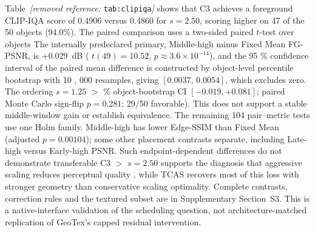 \documentclass[times,twocolumn,final]{elsarticle}
\providecommand{\DIFadd}[1]{{\protect\color{blue} \sf #1}} %
\providecommand{\DIFdel}[1]{{\protect\color{red} \scriptsize #1}} %
\providecommand{\DIFaddbegin}{} %
\providecommand{\DIFaddend}{} %
\providecommand{\DIFdelbegin}{} %
\providecommand{\DIFdelend}{} %
\begin{document}
\DIFdelbegin \DIFdel{Table~\textit{[removed reference: }\texttt{tab:clipiqa}\textit{]} shows that C3 achieves a foreground CLIP-IQA score of 0.4906 versus 0.4860 for $s = 2.50$, scoring higher on 47 of the 50 objects (94.0\%). The paired comparison uses a two-sided paired $t$-test over objects }\DIFdelend \DIFaddbegin \DIFadd{The internally predeclared primary, Middle-high minus Fixed Mean FG-PSNR, is $+0.029$~dB }\DIFaddend (\DIFdelbegin \DIFdel{$t(49)=10.52$, $p\approx3.6\times10^{-14}$), and the }\DIFdelend 95\DIFdelbegin \DIFdel{\% confidence interval of the paired mean difference is constructed by object-level percentile bootstrap with 10}%
\DIFdel{,}%
\DIFdel{000 resamples, giving $[0.0037,\,0.0054]$, which excludes zero. The ordering $s = 1.25$ $>$ }\DIFdelend \DIFaddbegin \DIFadd{\% object-bootstrap CI $[-0.019,+0.081]$; paired Monte Carlo sign-flip $p=0.281$; 29/50 favorable). This does not support a stable middle-window gain or establish equivalence. The remaining 104 pair--metric tests use one Holm family. Middle-high has lower Edge-SSIM than Fixed Mean (adjusted $p=0.00104$); some other placement contrasts separate, including Late-high versus Early-high PSNR. Such endpoint-dependent differences do not demonstrate transferable }\DIFaddend C3 \DIFdelbegin \DIFdel{$>$ $s = 2.50$ supports the diagnosis that aggressive scaling reduces perceptual quality , while TCAS recovers most of this loss with stronger geometry than conservative scaling}\DIFdelend \DIFaddbegin \DIFadd{optimality. Complete contrasts, correction rules and the textured subset are in Supplementary Section~S3. This is a native-interface validation of the scheduling question, not architecture-matched replication of GeoTex's capped residual intervention}\DIFaddend .
\end{document}
